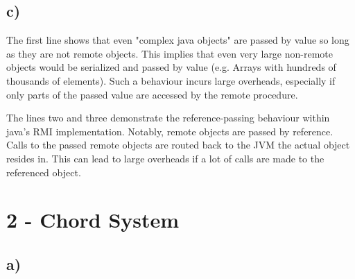 \documentclass{scrartcl}
\begin{document}
\subsection*{c)}

The first line shows that even "complex java objects" are passed by value so long as they are not remote objects. 
This implies that even very large non-remote objects would be serialized and passed by value (e.g. Arrays with hundreds of thousands of elements).
Such a behaviour incurs large overheads, especially if only parts of the passed value are accessed by the remote procedure.

The lines two and three demonstrate the reference-passing behaviour within java's RMI implementation. 
Notably, remote objects are passed by reference. 
Calls to the passed remote objects are routed back to the JVM the actual object resides in. 
This can lead to large overheads if a lot of calls are made to the referenced object.

\section*{2 - Chord System}
\subsection*{a)}
\end{document}
